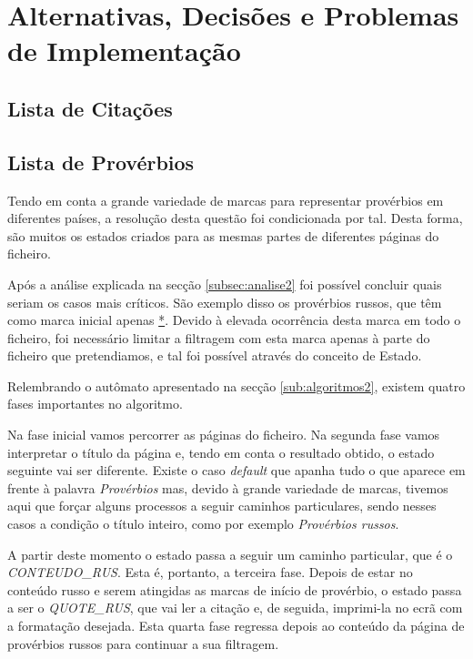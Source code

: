 \documentclass[11pt,a4paper]{report}
\begin{document}
\section{Alternativas, Decisões e Problemas de Implementação}
\subsection{Lista de Citações}


\subsection{Lista de Provérbios}

Tendo em conta a grande variedade de marcas para representar provérbios em diferentes países, a resolução desta questão foi condicionada por tal. Desta forma, são muitos os estados criados para as mesmas partes de diferentes páginas do ficheiro.

Após a análise explicada na secção \ref{subsec:analise2} foi possível concluir quais seriam os casos mais críticos. São exemplo disso os provérbios russos, que têm como marca inicial apenas \underline{*}. Devido à elevada ocorrência desta marca em todo o ficheiro, foi necessário limitar a filtragem com esta marca apenas à parte do ficheiro que pretendiamos, e tal foi possível através do conceito de Estado.

Relembrando o autômato apresentado na secção \ref{sub:algoritmos2}, existem quatro fases importantes no algoritmo.

Na fase inicial vamos percorrer as páginas do ficheiro. Na segunda fase vamos interpretar o título da página e, tendo em conta o resultado obtido, o estado seguinte vai ser diferente. Existe o caso \textit{default} que apanha tudo o que aparece em frente à palavra \textit{Provérbios} mas, devido à grande variedade de marcas, tivemos aqui que forçar alguns processos a seguir caminhos particulares, sendo nesses casos a condição o título inteiro, como por exemplo \textit{Provérbios russos}.

A partir deste momento o estado passa a seguir um caminho particular, que é o \textit{CONTEUDO\_RUS}. Esta é, portanto, a terceira fase. Depois de estar no conteúdo russo e serem atingidas as marcas de início de provérbio, o estado passa a ser o \textit{QUOTE\_RUS}, que vai ler a citação e, de seguida, imprimi-la no ecrã com a formatação desejada. Esta quarta fase regressa depois ao conteúdo da página de provérbios russos para continuar a sua filtragem.
\end{document}
